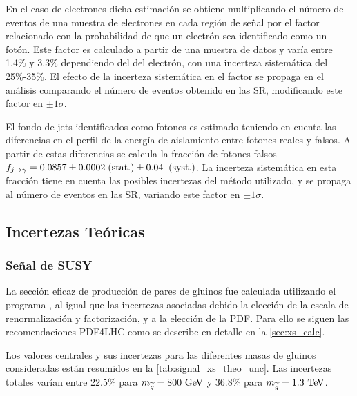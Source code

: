 En el caso de electrones dicha estimación se obtiene multiplicando el número de eventos
de una muestra de electrones en cada región de señal por el factor {\feg} relacionado
con la probabilidad de que un electrón sea identificado como un fotón.
Este factor es calculado a partir de una muestra de datos {\Zee} y varía entre 1.4\% y 3.3\%
dependiendo del {\abseta} del electrón, con una incerteza sistemática del 25\%-35\%.
El efecto de la incerteza sistemática en el factor {\feg} se propaga en
el análisis comparando el número de eventos obtenido en las SR, modificando este factor
en $\pm 1\sigma$.

El fondo de jets identificados como fotones es estimado teniendo en cuenta las
diferencias en el perfil de la energía de aislamiento entre fotones reales y falsos. A partir
de estas diferencias se calcula la fracción de fotones falsos $f_{j\rightarrow\gamma} = 0.0857 \pm 0.0002 \mbox{$\;$(stat.)} \pm 0.04 \;\mbox{$\;$(syst.)}$.
La incerteza sistemática en esta fracción tiene en cuenta las posibles incertezas
del método utilizado, y se propaga al número de eventos en las SR, variando
este factor en $\pm 1\sigma$.



\subsection{Incertezas Teóricas}\label{sec:theosyst}


\subsubsection{Señal de SUSY}\label{sec:syst_signal}

La sección eficaz de producción de pares de gluinos fue calculada utilizando
el programa {\nllfast}, al igual que las incertezas asociadas debido la elección
de la escala de renormalización y factorización, y a la elección de la PDF.
Para ello se siguen las recomendaciones PDF4LHC \cite{Botje:2011sn} como
se describe en detalle en la \cref{sec:xs_calc}.

Los valores centrales y sus incertezas para las diferentes masas de gluinos consideradas están resumidos en
la \cref{tab:signal_xs_theo_unc}. Las incertezas totales varían entre 22.5\% para $m_{\gluino} = 800\GeV$
y 36.8\% para $m_{\gluino} = 1.3 \tev$.

